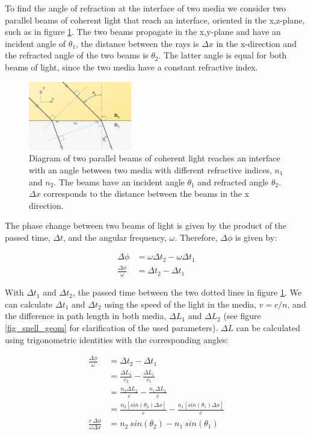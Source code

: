 \documentclass{article}
\begin{document}
To find the angle of refraction at the interface of two media we consider two parallel beams of coherent light that reach an interface, oriented in the x,z-plane, such as in figure \ref{fig_snell_geom_empty}. The two beams propagate in the x,y-plane and have an incident angle of $\theta_1$, the distance between the rays is $\Delta x$ in the x-direction and the refracted angle of the two beams is $\theta _2$. The latter angle is equal for both beams of light, since the two media have a constant refractive index. \\

\begin{figure}[h!]
	\centering
	\includegraphics[width=0.4\textwidth]{afbeeldingen/snell_geom_empty.jpg}
	\caption{Diagram of two parallel beams of coherent light reaches an interface  with an angle between two media with different refractive indices, $n_1$ and $n_2$. The beams have an incident angle $ \theta_1$ and refracted angle $\theta_2$. $\Delta x$ corresponds to the distance between the beams in the x direction. }
	\label{fig_snell_geom_empty}
\end{figure}

The phase change between two beams of light is given by the product of the passed time, $\Delta t$, and the angular frequency, $\omega$. Therefore, $\Delta \phi$ is given by:

\begin{align*}
	\Delta \phi &= \omega \Delta t_2 - \omega \Delta t_1 \\
	\frac{\Delta \phi}{\omega} &= \Delta t_2 - \Delta t_1
\end{align*}

With $\Delta t_1$ and $\Delta t_2$, the passed time between the two dotted lines in figure \ref{fig_snell_geom_empty}.
We can calculate $\Delta t_1$ and $\Delta t_2$ using the speed of the light in the media, $v = c/n$, and the difference in path length in both media, $\Delta L_1$ and $\Delta L_2$ (see figure \ref{fig_snell_geom} for clarification of the used parameters). $\Delta L$ can be calculated using trigonometric identities with the corresponding angles:

\begin{align*}
	\frac{\Delta \phi}{\omega} &= \Delta t_2 - \Delta t_1 \\
	&= \frac{\Delta L_2}{v_2} - \frac{\Delta L_1}{v_1} \\
	&= \frac{n_2 \Delta L_2}{c} - \frac{n_1 \Delta L_1}{c} \\
	&= \frac{n_2 [sin(\theta_2) \Delta x]}{c} - \frac{n_1 [sin(\theta_1) \Delta x]}{c} \\
	\frac{c \: \Delta \phi}{\omega \Delta x} &=  n_2 \: sin(\theta_2) - n_1 \: sin(\theta_1)   \\
\end{align*}
\end{document}
